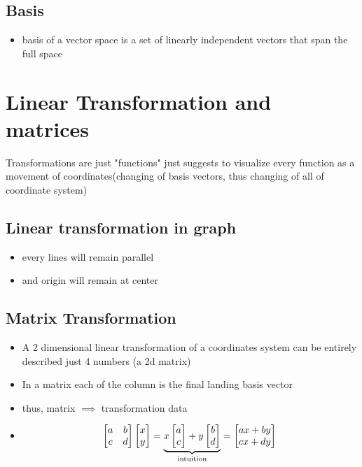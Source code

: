 \documentclass[a4paper]{article}
\begin{document}
\subsection{Basis}
\begin{itemize}
	\item basis of a vector space is a set of linearly independent vectors
	      that span the full space
\end{itemize}

\newpage
\section{Linear Transformation and matrices}
Transformations are just "functions" just suggests to visualize
every function as a movement of coordinates(changing of basis vectors,
thus changing of all of coordinate system)

\subsection{Linear transformation in graph}
\begin{itemize}
	\item every lines will remain parallel
	\item and origin will remain at center
\end{itemize}

\subsection{Matrix Transformation}
\begin{itemize}
	\item A 2 dimensional linear transformation of a coordinates
	      system can be entirely described just 4 numbers (a 2d matrix)
	\item  In a matrix each of the column is the final landing
	      basis vector
	\item thus, matrix $\implies$ transformation data
	\item
	      \[
		      \begin{bmatrix} a & b \\
                c & d\end{bmatrix}
		      \begin{bmatrix} x \\ y \end{bmatrix}
		      = \underbrace{x\begin{bmatrix} a \\ c\end{bmatrix}
			      + y \begin{bmatrix} b \\ d  \end{bmatrix}}
		      _{\text{intuition}}
		      = \begin{bmatrix} ax + by \\
			      cx + dy\end{bmatrix} \\
	      \]
\end{itemize}
\end{document}
